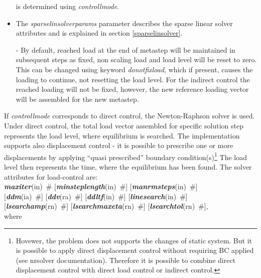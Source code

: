 \documentclass[draft]{article}
\newcommand{\param}[1]{{\em #1}}
\newcommand{\keywordnotype}[1]{\mbox{{\it{\bf{#1}}}}}
\newcommand{\keyword}[2]{\mbox{{\keywordnotype{#1}\tiny (#2)}}}
\newcommand{\field}[2]{\mbox{\keyword{#1}{#2}~\#}}
\newcommand{\optField}[2]{\mbox{[\field{#1}{#2}]}}
\begin{document}
\begin{itemize}
is determined using \param{controllmode}.
\item The  \param{sparselinsolverparams} parameter describes the sparse
linear solver attributes and is explained in section
\ref{sparselinsolver}.
\item[-] By default, reached load at the end of
metastep will be maintained in subsequent steps as fixed, non scaling
load and load level will be reset to zero. This can be changed using keyword \param{donotfixload}, which if
present, causes the loading to continue, not resetting the load
level. For the indirect control the reached loading will not be
fixed, however, the new reference loading vector will be assembled for
the new metastep. 
\end{itemize}

If \param{controllmode} corresponds to direct control, the
Newton-Raphson solver is used. Under direct control, the total load
vector assembled for specific solution step represents the load level,
where equilibrium is searched. The implementation supports also
displacement control -  it is possible to prescribe one or more
displacements by applying ``quasi prescribed'' boundary
condition(s)\footnote{Hovewer, the problem does not supports the
changes of static system. But it is possible to apply direct
displacement control without requiring BC applied (see nrsolver
documentation). Therefore it is possible to combine
direct displacement control with direct load control or indirect
control.} 
The load level then represents the
time, where the equilibrium has been found. The solver attributes for
load-control are:\\ \field{maxiter}{in} \optField{minsteplength}{in}
\optField{manrmsteps}{in}\\ \optField{ddm}{ia} \optField{ddv}{ra}
\optField{ddltf}{in} \optField{linesearch}{in}\\
\optField{lsearchamp}{rn} \optField{lsearchmaxeta}{rn} \optField{lsearchtol}{rn},\\ where 
\end{document}
